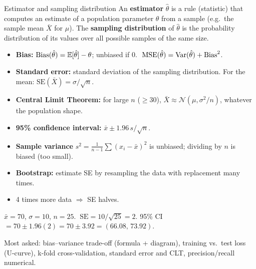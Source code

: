 \begin{dfn}{Estimator and sampling distribution}
An \textbf{estimator} $\hat\theta$ is a rule (statistic) that computes an estimate of a population parameter $\theta$ from a sample (e.g.\ the sample mean $\bar X$ for $\mu$). The \textbf{sampling distribution} of $\hat\theta$ is the probability distribution of its values over all possible samples of the same size.
\end{dfn}

\begin{itemize}
  \item \textbf{Bias:} $\operatorname{Bias}(\hat\theta)=\mathbb{E}[\hat\theta]-\theta$; unbiased if $0$. $\ \mathrm{MSE}(\hat\theta)=\Var(\hat\theta)+\Bias^2$.
  \item \textbf{Standard error:} standard deviation of the sampling distribution. For the mean: $\mathrm{SE}(\bar X)=\sigma/\sqrt n$.
  \item \textbf{Central Limit Theorem:} for large $n$ ($\ge30$), $\bar X\approx\mathcal N(\mu,\sigma^2/n)$, whatever the population shape.
  \item \textbf{95\% confidence interval:} $\bar x\pm1.96\,s/\sqrt n$.
  \item \textbf{Sample variance} $s^2=\frac{1}{n-1}\sum(x_i-\bar x)^2$ is unbiased; dividing by $n$ is biased (too small).
  \item \textbf{Bootstrap:} estimate SE by resampling the data with replacement many times.
  \item 4 times more data $\Rightarrow$ SE halves.
\end{itemize}

\begin{numer}
$\bar x=70$, $\sigma=10$, $n=25$. $\ \mathrm{SE}=10/\sqrt{25}=2$. 95\% CI $=70\pm1.96(2)=70\pm3.92=(66.08,\,73.92)$.
\end{numer}

\begin{imp}
Most asked: bias--variance trade-off (formula + diagram), training vs.\ test loss (U-curve), k-fold cross-validation, standard error and CLT, precision/recall numerical.
\end{imp}

